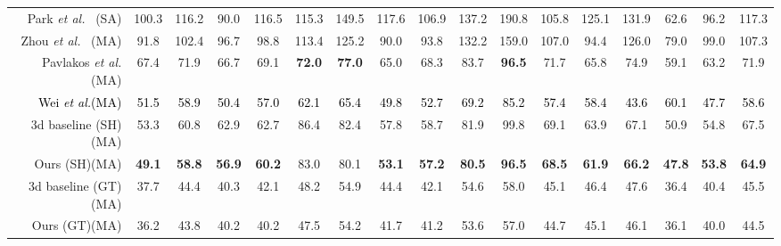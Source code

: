 \documentclass[10pt,journal,compsoc]{IEEEtran}
\begin{document}
\begin{table*}[!t]
\begin{tabular}{ r ||c|c|c|c|c|c|c|c|c|c|c|c|c|c|c||c }
  Park \emph{et al.}~\cite{park20163d} (SA) & 100.3 &  116.2  & 90.0  & 116.5  & 115.3 & 149.5  & 117.6 & 106.9 & 137.2 &190.8 & 105.8  & 125.1  & 131.9 & 62.6 & 96.2 &117.3\\
  Zhou \emph{et al.}~\cite{zhou2016deep} (MA)& 91.8 &  102.4  & 96.7  & 98.8  & 113.4  & 125.2  & 90.0 & 93.8 & 132.2 &159.0 & 107.0  & 94.4  & 126.0 & 79.0 & 99.0 &107.3\\
  Pavlakos \emph{et al.} (MA) \cite{pavlakos2016coarse}  & 67.4 &  71.9 & 66.7 & 69.1  & \textbf{72.0} & \textbf{77.0}  & 65.0 & 68.3 & 83.7 &\textbf{96.5} & 71.7  & 65.8  & 74.9& 59.1 & 63.2 &71.9\\
	 \textcolor{black}{Wei \emph{et al.}(MA) \cite{yang20183d}}\textcolor{black}{\footnotemark[1]}  & \textcolor{black}{51.5} &  \textcolor{black}{58.9} & \textcolor{black}{50.4} & \textcolor{black}{57.0}  & \textcolor{black}{62.1} & \textcolor{black}{65.4}  & \textcolor{black}{49.8} & \textcolor{black}{52.7} &  \textcolor{black}{69.2} &\textcolor{black}{ 85.2} & \textcolor{black}{57.4}  & \textcolor{black}{58.4}  &  \textcolor{black}{43.6}& \textcolor{black}{60.1} & \textcolor{black}{47.7} &\textcolor{black}{58.6}\\

  \hline
  \hline
  3d baseline (SH)(MA) \cite{martinez2017simple}  & 53.3 &  60.8  & 62.9  & 62.7  & 86.4  & 82.4 & 57.8 & 58.7 & 81.9 &99.8 & 69.1  & 63.9  & 67.1 & 50.9 & 54.8 &67.5\\
      Ours (SH)(MA) & \textbf{49.1} &  \textbf{58.8}  & \textbf{56.9 } & \textbf{60.2}  & 83.0  & 80.1 & \textbf{53.1} & \textbf{57.2} & \textbf{80.5} &\textbf{96.5} & \textbf{68.5}  & \textbf{61.9}  & \textbf{66.2} & \textbf{47.8} & \textbf{53.8} &\textbf{64.9}\\
   \hline
   3d baseline (GT)(MA) \cite{martinez2017simple}  & 37.7 &  44.4  & 40.3  & 42.1  & 48.2 & 54.9 & 44.4 & 42.1 & 54.6 &58.0 & 45.1  & 46.4 & 47.6 & 36.4 & 40.4 &45.5\\
     Ours (GT)(MA) & {36.2} & {43.8}  & {40.2 } & {40.2}  & 47.5  & 54.2 & {41.7} & {41.2} & {53.6} &{57.0} & {44.7}  & {45.1}  & {46.1} & {36.1} & {40.0} &{44.5}\\

  \hline
 \end{tabular}
\end{table*}
\end{document}
